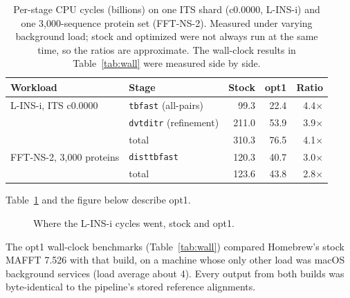 \documentclass[11pt]{article}
\newcommand{\code}[1]{\texttt{#1}}
\begin{document}
\begin{table}[h]
\centering
\caption{Per-stage CPU cycles (billions) on one ITS shard (c0.0000, L-INS-i) and one
3{,}000-sequence protein set (FFT-NS-2). Measured under varying background load; stock and
optimized were not always run at the same time, so the ratios are approximate. The wall-clock
results in Table~\ref{tab:wall} were measured side by side.}
\label{tab:cycles}
\begin{tabular}{llrrr}
\toprule
Workload & Stage & Stock & opt1 & Ratio \\
\midrule
L-INS-i, ITS c0.0000 & \code{tbfast} (all-pairs) & 99.3 & 22.4 & 4.4$\times$ \\
                     & \code{dvtditr} (refinement) & 211.0 & 53.9 & 3.9$\times$ \\
                     & total & 310.3 & 76.5 & 4.1$\times$ \\
\midrule
FFT-NS-2, 3{,}000 proteins & \code{disttbfast} & 120.3 & 40.7 & 3.0$\times$ \\
                           & total & 123.6 & 43.8 & 2.8$\times$ \\
\bottomrule
\end{tabular}
\end{table}

Table~\ref{tab:cycles} and the figure below describe opt1.

\begin{figure}[h]
\centering
{}
\caption{Where the L-INS-i cycles went, stock and opt1.}
\end{figure}

The opt1 wall-clock benchmarks (Table~\ref{tab:wall}) compared Homebrew's stock MAFFT 7.526
with that build, on a machine whose only other load was macOS background services (load
average about 4). Every output from both builds was byte-identical to the pipeline's stored
reference alignments.
\end{document}

